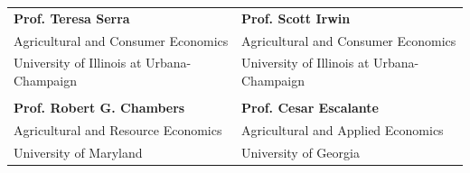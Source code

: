 
\begin{tabular}{p{} p{}}
\textbf{Prof. Teresa Serra} & \textbf{Prof. Scott Irwin} \\
Agricultural and Consumer Economics & Agricultural and Consumer Economics \\
University of Illinois at Urbana-Champaign & University of Illinois at Urbana-Champaign \\
    
\vspace{10pt} & \vspace{10pt} \\
    
\textbf{Prof. Robert G. Chambers} & \textbf{Prof. Cesar Escalante}\\
Agricultural and Resource Economics & Agricultural and Applied Economics\\
University of Maryland & University of Georgia
\end{tabular}